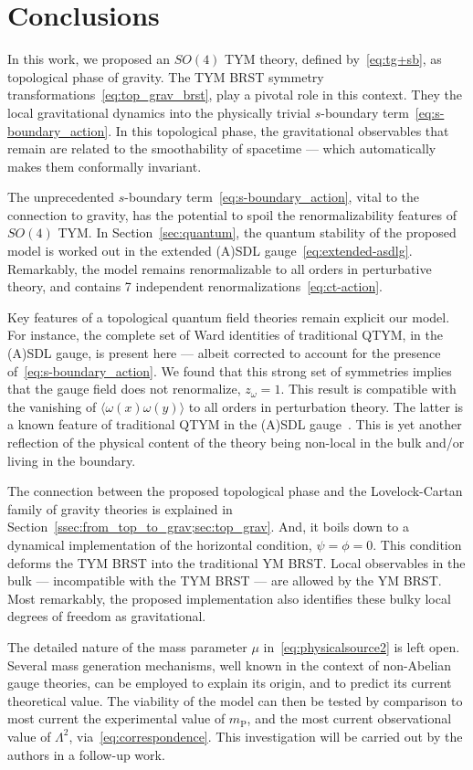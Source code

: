 \documentclass[../main.tex]{subfiles}
\begin{document}
\section{Conclusions}%
\label{sec:conclusions}

In this work, we proposed an $ SO \left( 4 \right) $ TYM theory, defined by~\eqref{eq:tg+sb}, as topological phase of gravity. The TYM BRST symmetry transformations~\eqref{eq:top_grav_brst}, play a pivotal role in this context. They  the local gravitational dynamics into the physically trivial $s$-boundary term~\eqref{eq:s-boundary_action}. In this topological phase, the gravitational observables that remain are related to the smoothability of spacetime --- which automatically makes them conformally invariant.

The unprecedented $ s $-boundary term~\eqref{eq:s-boundary_action}, vital to the connection to gravity, has the potential to spoil the renormalizability features of $ SO(4) $ TYM\@. In Section~\ref{sec:quantum}, the quantum stability of the proposed model is worked out in the extended (A)SDL gauge~\eqref{eq:extended-asdlg}. Remarkably, the model remains renormalizable to all orders in perturbative theory, and contains 7 independent renormalizations~\eqref{eq:ct-action}.

Key features of a topological quantum field theories remain explicit our model. For instance, the complete set of Ward identities of traditional QTYM, in the (A)SDL gauge, is present here --- albeit corrected to account for the presence of~\eqref{eq:s-boundary_action}. We found that this strong set of symmetries implies that the gauge field does not renormalize, $ z_{ \omega } = 1 $. This result is compatible with the vanishing of $ \langle \omega(x) \omega(y) \rangle $ to all orders in perturbation theory. The latter is a known feature of traditional QTYM in the (A)SDL gauge~\cite{sadovski2017c,sadovski2018a}. This is yet another reflection of the physical content of the theory being non-local in the bulk and/or living in the boundary.

The connection between the proposed topological phase and the Lovelock-Cartan family of gravity theories is explained in Section~\ref{ssec:from_top_to_grav;sec:top_grav}. And, it boils down to a dynamical implementation of the horizontal condition, $ \psi = \phi = 0 $. This condition deforms the TYM BRST into the traditional YM BRST\@. Local observables in the bulk --- incompatible with the TYM BRST --- are allowed by the YM BRST\@. Most remarkably, the proposed implementation also identifies these bulky local degrees of freedom as gravitational.

The detailed nature of the mass parameter $ \mu $ in~\eqref{eq:physicalsource2} is left open. Several mass generation mechanisms, well known in the context of non-Abelian gauge theories, can be employed to explain its origin, and to predict its current theoretical value. The viability of the model can then be tested by comparison to most current the experimental value of $ m_{ \text{P} } $, and the most current observational value of $ \Lambda^2 $, via~\eqref{eq:correspondence}. This investigation will be carried out by the authors in a follow-up work.
\end{document}
